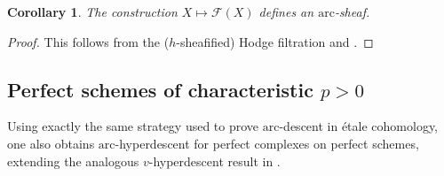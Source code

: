 \documentclass[reqno]{amsart}
\newcommand{\sF}{\mathcal{F}}
\newcommand{\arc}{\mathrm{arc}}
\newtheorem{corollary}[theorem]{Corollary}
\theoremstyle{definition}
\begin{document}
\begin{corollary} 
The construction $X \mapsto \sF(X)$ defines an $\arc$-sheaf. 
\end{corollary} 
\begin{proof} 
This follows from 
the ($h$-sheafified) Hodge filtration and . 
\end{proof} 

\subsection{Perfect schemes of characteristic $p> 0$}
Using exactly the same strategy used to prove $\arc$-descent in \'etale cohomology, one also obtains $\arc$-hyperdescent for perfect complexes on perfect schemes, extending the analogous $v$-hyperdescent result in \cite[Theorem 11.2 (2)]{BhattScholzeWitt}.
\end{document}
